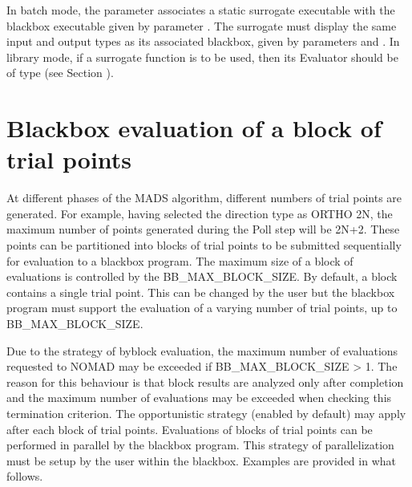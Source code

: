 \documentclass[letterpaper,10pt,english]{sphinxmanual}
\begin{document}
\sphinxAtStartPar
In batch mode, the parameter  associates a static surrogate executable with the blackbox executable given by parameter . The surrogate must display the same input and output types as its associated blackbox, given by parameters  and . In library mode, if a surrogate function is to be used, then its Evaluator should be of type  (see Section {\hyperref[\detokenize{LibraryMode:library-mode}]{}}).


\section{Blackbox evaluation of a block of trial points}
\label{\detokenize{AdvancedFunctionalities:blackbox-evaluation-of-a-block-of-trial-points}}\label{\detokenize{AdvancedFunctionalities:block-evaluations}}
\sphinxAtStartPar
At different phases of the MADS algorithm, different numbers of trial points are generated.
For example, having selected the direction type as ORTHO 2N, the maximum number of points generated during
the Poll step will be 2N+2. These points can be partitioned into blocks of trial points to be
submitted sequentially for evaluation to a blackbox program. The maximum size of a block of
evaluations is controlled by the BB\_MAX\_BLOCK\_SIZE. By default, a block contains a single trial
point. This can be changed by the user but the blackbox program must support the evaluation
of a varying number of trial points, up to BB\_MAX\_BLOCK\_SIZE.

\sphinxAtStartPar
Due to the strategy of by\sphinxhyphen{}block evaluation, the maximum number of evaluations requested to
NOMAD may be exceeded if BB\_MAX\_BLOCK\_SIZE \textgreater{} 1. The reason for this behaviour is that
block results are analyzed only after completion and the maximum number of evaluations may
be exceeded when checking this termination criterion.
The opportunistic strategy (enabled by default) may apply after each block of trial points.
Evaluations of blocks of trial points can be performed in parallel by the blackbox program. This
strategy of parallelization must be setup by the user within the blackbox. Examples are provided
in what follows.
\end{document}
